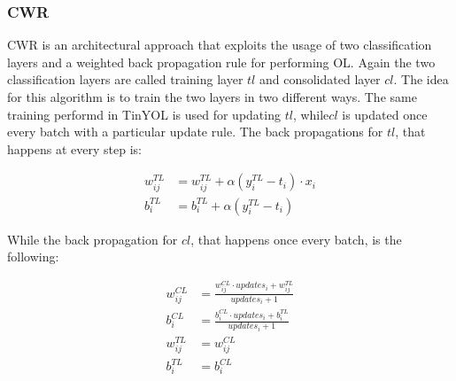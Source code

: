 \documentclass[12pt]{report}
\begin{document}
\subsubsection{CWR}
CWR is an architectural approach that exploits the usage of two classification layers and a weighted back propagation rule for performing OL. Again the two classification layers are called training layer $tl$ and consolidated layer $cl$. The idea for this algorithm is to train the two layers in two different ways. The same training performd in TinYOL is used for updating $tl$, while$cl$ is updated once every batch with a particular update rule. The back propagations for $tl$, that happens at every step is:

\begin{align}
	w^{TL}_{ij} &= w^{TL}_{ij} + \alpha (y^{TL}_i - t_i) \cdot x_i \\
    b^{TL}_i    &= b^{TL}_i + \alpha  (y^{TL}_i - t_i) 
\end{align}

While the back propagation for $cl$, that happens once every batch, is the following:

\begin{align}
	w^{CL}_{ij} &= \frac{w^{CL}_{ij} \cdot updates_{i} + w^{TL}_{ij}}{updates_{i} + 1} \label{cwrweight}\\ 
	b^{CL}_{i}  &= \frac{b^{CL}_{i} \cdot updates_{i} + b^{TL}_{i}}{updates_{i} + 1} \\ 
    w^{TL}_{ij} &=  w^{CL}_{ij} \\
    b^{TL}_{i}  &=  b^{CL}_{i} 
\end{align}
\end{document}
